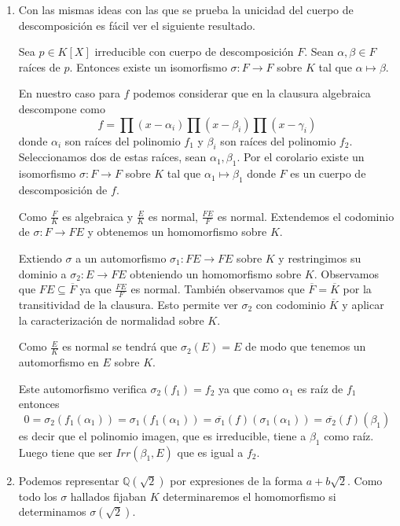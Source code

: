 \begin{enumerate}
\item Con las mismas ideas con las que se prueba la unicidad del cuerpo de descomposición es fácil ver el siguiente resultado. 

\begin{corollary}
Sea $p \in K[X]$ irreducible con cuerpo de descomposición $F$. Sean $\alpha,\beta \in F$ raíces de $p$. Entonces existe un isomorfismo $\sigma:F \to F$ sobre $K$ tal que $\alpha \mapsto \beta$. 
\end{corollary}

En nuestro caso para $f$ podemos considerar que en la clausura algebraica descompone como $$f = \prod (x - \alpha_i) \prod (x - \beta_i) \prod (x - \gamma_i)$$ donde $\alpha_i$ son raíces del polinomio $f_1$ y $\beta_i$ son raíces del polinomio $f_2$. Seleccionamos dos de estas raíces, sean $\alpha_1, \beta_1$. Por el corolario existe un isomorfismo $\sigma:F \to F$ sobre $K$ tal que $\alpha_1 \mapsto \beta_1$ donde $F$ es un cuerpo de descomposición de $f$. 

Como $\frac{F}{K}$ es algebraica y $\frac{E}{K}$ es normal, $\frac{FE}{F}$ es normal. Extendemos el codominio de $\sigma:F \to FE$ y obtenemos un homomorfismo sobre $K$.

Extiendo $\sigma$ a un automorfismo $\sigma_1:FE \to FE$ sobre $K$ y restringimos su dominio a $\sigma_2:E \to FE$ obteniendo un homomorfismo sobre $K$. Observamos que $FE \subseteq \overline{F}$ ya que $\frac{FE}{F}$ es normal. También observamos que $\overline{F} = \overline{K}$ por la transitividad de la clausura. Esto permite ver $\sigma_2$ con codominio $\overline{K}$ y aplicar la caracterización de normalidad sobre $K$. 

Como $\frac{E}{K}$ es normal se tendrá que $\sigma_2(E) = E$ de modo que tenemos un automorfismo en $E$ sobre $K$. 

Este automorfismo verifica $\sigma_2(f_1) = f_2$ ya que como $\alpha_1$ es raíz de $f_1$ entonces $$0 = \sigma_2(f_1(\alpha_1)) = \sigma_1(f_1(\alpha_1)) = \overline{\sigma_1}(f)(\sigma_1(\alpha_1)) = \overline{\sigma_2}(f)(\beta_1)$$ es decir que el polinomio imagen, que es irreducible, tiene a $\beta_1$ como raíz. Luego tiene que ser $Irr(\beta_1,E)$ que es igual a $f_2$. 

\item Podemos representar $\mathbb{Q}(\sqrt{2})$ por expresiones de la forma $a + b \sqrt{2}$. Como todo los $\sigma$ hallados fijaban $K$ determinaremos el homomorfismo si determinamos $\sigma(\sqrt{2})$.


\end{enumerate}
